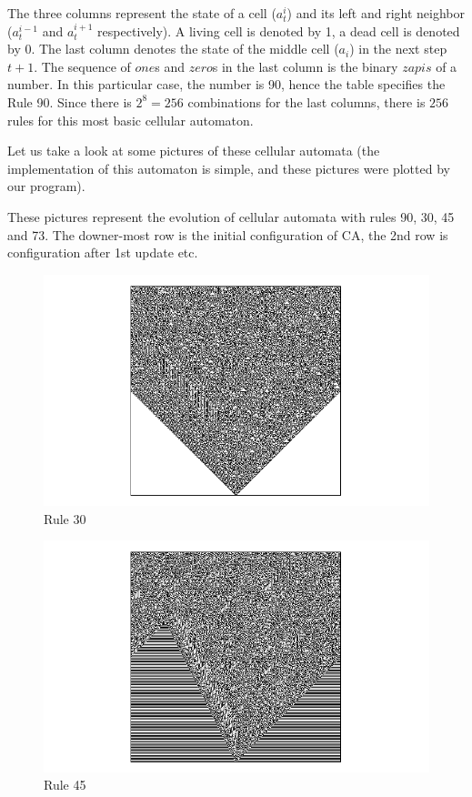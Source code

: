 
The three columns represent the state of a cell ($a_t^i$) and its left and right neighbor ($a_t^{i-1}$ and $a_t^{i+1}$ respectively). A living cell is denoted by 1, a dead cell is denoted by 0. The last column denotes the state of the middle cell ($a_i$) in the next step $t+1$. The sequence of $one$s and $zero$s in the last column is the binary $zapis$ of a number. In this particular case, the number is 90, hence the table specifies the Rule 90.
Since there is $2^8=256$ combinations for the last columns, there is $256$ rules for this most basic cellular automaton.

Let us take a look at some pictures of these cellular automata (the implementation of this automaton is simple, and these pictures were plotted by our program).

These pictures represent the evolution of cellular automata with rules 90, 30, 45 and 73.
The downer-most row is the initial configuration of CA, 
the 2nd row is configuration after 1st update etc.

\begin{figure}[!t]
 \centering
 \includegraphics[trim = 40mm 0mm 0mm 0mm, width=1.7\textwidth]{./img/30_500}
 \caption{Rule 30}
\end{figure}

\begin{figure}[!b]
 \centering
 \includegraphics[trim = 40mm 0mm 0mm 0mm, width=1.7\textwidth]{./img/45_500}
 \caption{Rule 45}
\end{figure}

